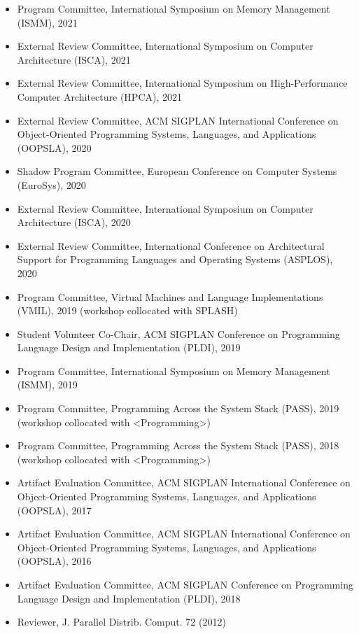 \documentclass[singlecolumn,singlespace,11pt]{article}
\begin{document}
\begin{itemize}
\item Program Committee, International Symposium on Memory Management (ISMM), 2021
\item External Review Committee, International Symposium on Computer Architecture (ISCA), 2021
\item External Review Committee, International Symposium on High-Performance Computer Architecture (HPCA), 2021
\item External Review Committee, ACM SIGPLAN International Conference on Object-Oriented Programming Systems, Languages, and Applications (OOPSLA), 2020
\item Shadow Program Committee, European Conference on Computer Systems (EuroSys), 2020
\item External Review Committee, International Symposium on Computer Architecture (ISCA), 2020
\item External Review Committee, International Conference on Architectural Support for Programming Languages and Operating Systems (ASPLOS), 2020
\item Program Committee, Virtual Machines and Language Implementations (VMIL), 2019 (workshop collocated with SPLASH)
\item Student Volunteer Co-Chair, ACM SIGPLAN Conference on Programming Language Design and Implementation (PLDI), 2019
\item Program Committee, International Symposium on Memory Management (ISMM), 2019
\item Program Committee, Programming Across the System Stack (PASS), 2019 (workshop collocated with <Programming>) 
\item Program Committee, Programming Across the System Stack (PASS), 2018 (workshop collocated with  <Programming>) 
\item Artifact Evaluation Committee, ACM SIGPLAN International Conference on Object-Oriented Programming Systems, Languages, and Applications (OOPSLA), 2017  
\item Artifact Evaluation Committee, ACM SIGPLAN International Conference on Object-Oriented Programming Systems, Languages, and Applications (OOPSLA), 2016  
\item Artifact Evaluation Committee, ACM SIGPLAN Conference on Programming Language Design and Implementation (PLDI), 2018
\item Reviewer, J. Parallel Distrib. Comput. 72 (2012) 
\end{itemize}
\end{document}
